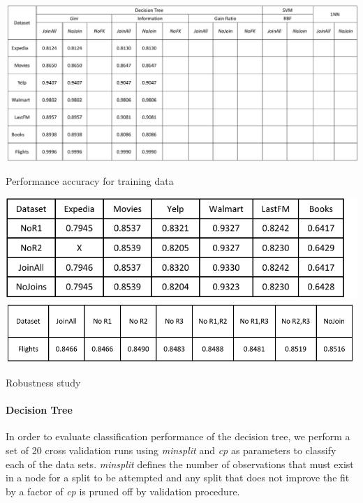 \documentclass[sigconf]{acmart}
\begin{document}
\begin{table}
\centering
\includegraphics[width=2\columnwidth,height=\textheight,keepaspectratio]{table3.pdf}
\caption{Performance accuracy for training data}
\label{Table:svm_train_tree}
\end{table}
\begin{table}
\centering
\includegraphics[width=\columnwidth,height=\textheight,keepaspectratio]{table4.pdf}
\includegraphics[width=\columnwidth,height=\textheight,keepaspectratio]{table5.pdf}
\caption{Robustness study}
\label{Table:robustness}
\end{table}
\paragraph*{Decision Tree}
In order to evaluate classification performance of the decision tree, we perform a set of 20 cross validation runs using \textit{minsplit} and \textit{cp} as parameters to classify each of the data sets. \textit{minsplit} defines the number of observations that must exist in a node for a split to be attempted and any split that does not improve the fit by a factor of \textit{cp} is pruned off by validation procedure.   
\end{document}
